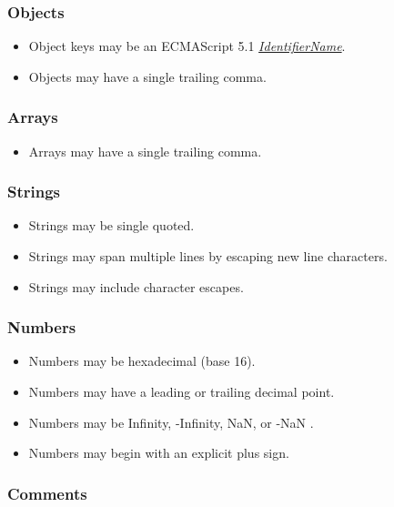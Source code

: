 \documentclass{article}
\newcommand{\token}[1]{\emph{#1}}
\newcommand{\esref}[2]{\href{https://es5.github.io/\#x#2}{#1}}
\begin{document}
\subsubsection*{Objects}

\begin{itemize}
	\item Object keys may be an ECMAScript 5.1 \esref{\token{IdentifierName}}{7.6}.
	\item Objects may have a single trailing comma.
\end{itemize}

\subsubsection*{Arrays}

\begin{itemize}
	\item Arrays may have a single trailing comma.
\end{itemize}

\subsubsection*{Strings}

\begin{itemize}
	\item Strings may be single quoted.
	\item Strings may span multiple lines by escaping new line characters.
	\item Strings may include character escapes.
\end{itemize}

\subsubsection*{Numbers}

\begin{itemize}
	\item Numbers may be hexadecimal (base 16).
	\item Numbers may have a leading or trailing decimal point.
	\item Numbers may be Infinity, -Infinity, NaN, or -NaN \cite{float}.
	\item Numbers may begin with an explicit plus sign.
\end{itemize}

\subsubsection*{Comments}
\end{document}
